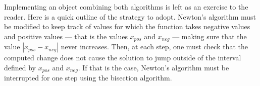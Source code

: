 Implementing an object combining both algorithms is left as an
exercise to the reader. Here is a quick outline of the strategy to
adopt. Newton's algorithm must be modified to keep track of values
for which the function takes negative values and positive values
--- that is the values $x_{pos}$ and $x_{neg}$
--- making sure that the value $\left| x_{pos}-x_{neg}\right|$
never increases. Then, at each step, one must check that the
computed change does not cause the solution to jump outside of the
interval defined by $x_{pos}$ and $x_{neg}$.
If that is the case, Newton's algorithm must be interrupted for one step using the bisection algorithm.


